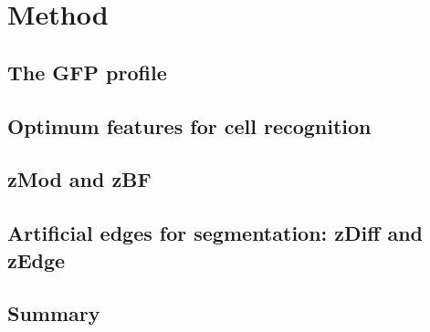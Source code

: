 
\chapter{Method}

\ifpdf
    \graphicspath{{Chapter4/Figs/Raster/}{Chapter4/Figs/PDF/}{Chapter4/Figs/}}
\else
    \graphicspath{{Chapter4/Figs/Vector/}{Chapter4/Figs/}}
\fi

\section{The GFP profile}
\section{Optimum features for cell recognition}
\section{zMod and zBF}
\section{Artificial edges for segmentation: zDiff and zEdge}
\section{Summary}
